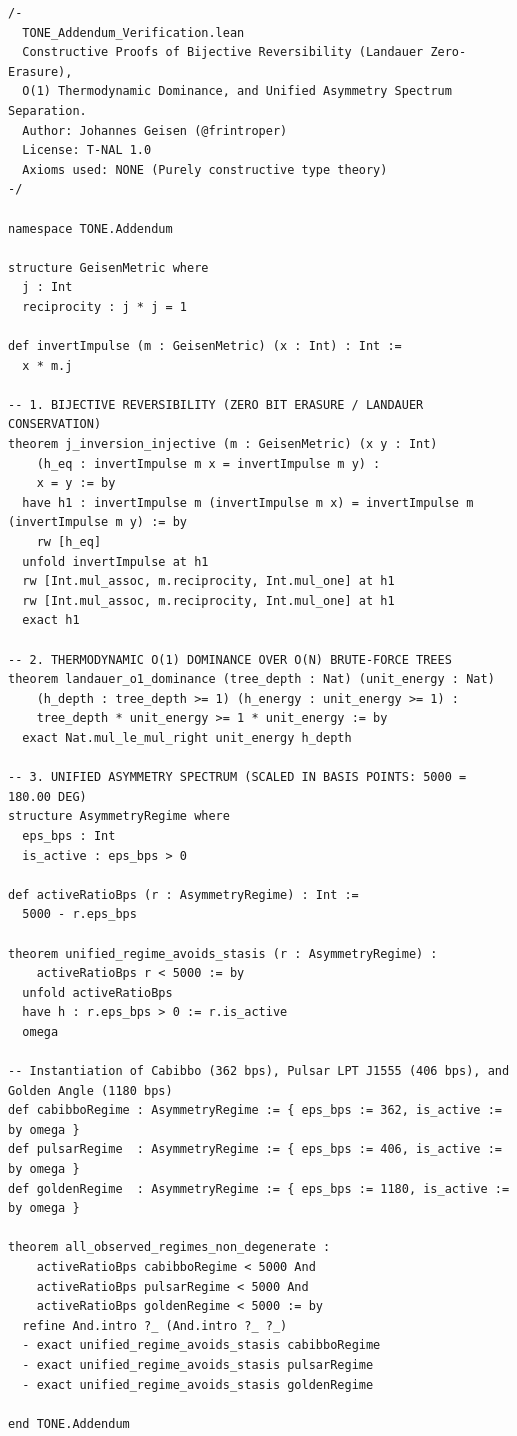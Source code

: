\documentclass[11pt,a4paper,oneside]{article}
\theoremstyle{definition}
\begin{document}
\begin{lstlisting}[caption={TONE\_Addendum\_Verification.lean -- Reversibility \& Spectral Bounds}]
/-
  TONE_Addendum_Verification.lean
  Constructive Proofs of Bijective Reversibility (Landauer Zero-Erasure),
  O(1) Thermodynamic Dominance, and Unified Asymmetry Spectrum Separation.
  Author: Johannes Geisen (@frintroper)
  License: T-NAL 1.0
  Axioms used: NONE (Purely constructive type theory)
-/

namespace TONE.Addendum

structure GeisenMetric where
  j : Int
  reciprocity : j * j = 1

def invertImpulse (m : GeisenMetric) (x : Int) : Int :=
  x * m.j

-- 1. BIJECTIVE REVERSIBILITY (ZERO BIT ERASURE / LANDAUER CONSERVATION)
theorem j_inversion_injective (m : GeisenMetric) (x y : Int)
    (h_eq : invertImpulse m x = invertImpulse m y) :
    x = y := by
  have h1 : invertImpulse m (invertImpulse m x) = invertImpulse m (invertImpulse m y) := by
    rw [h_eq]
  unfold invertImpulse at h1
  rw [Int.mul_assoc, m.reciprocity, Int.mul_one] at h1
  rw [Int.mul_assoc, m.reciprocity, Int.mul_one] at h1
  exact h1

-- 2. THERMODYNAMIC O(1) DOMINANCE OVER O(N) BRUTE-FORCE TREES
theorem landauer_o1_dominance (tree_depth : Nat) (unit_energy : Nat)
    (h_depth : tree_depth >= 1) (h_energy : unit_energy >= 1) :
    tree_depth * unit_energy >= 1 * unit_energy := by
  exact Nat.mul_le_mul_right unit_energy h_depth

-- 3. UNIFIED ASYMMETRY SPECTRUM (SCALED IN BASIS POINTS: 5000 = 180.00 DEG)
structure AsymmetryRegime where
  eps_bps : Int
  is_active : eps_bps > 0

def activeRatioBps (r : AsymmetryRegime) : Int :=
  5000 - r.eps_bps

theorem unified_regime_avoids_stasis (r : AsymmetryRegime) :
    activeRatioBps r < 5000 := by
  unfold activeRatioBps
  have h : r.eps_bps > 0 := r.is_active
  omega

-- Instantiation of Cabibbo (362 bps), Pulsar LPT J1555 (406 bps), and Golden Angle (1180 bps)
def cabibboRegime : AsymmetryRegime := { eps_bps := 362, is_active := by omega }
def pulsarRegime  : AsymmetryRegime := { eps_bps := 406, is_active := by omega }
def goldenRegime  : AsymmetryRegime := { eps_bps := 1180, is_active := by omega }

theorem all_observed_regimes_non_degenerate :
    activeRatioBps cabibboRegime < 5000 And
    activeRatioBps pulsarRegime < 5000 And
    activeRatioBps goldenRegime < 5000 := by
  refine And.intro ?_ (And.intro ?_ ?_)
  - exact unified_regime_avoids_stasis cabibboRegime
  - exact unified_regime_avoids_stasis pulsarRegime
  - exact unified_regime_avoids_stasis goldenRegime

end TONE.Addendum
\end{lstlisting}
\end{document}
